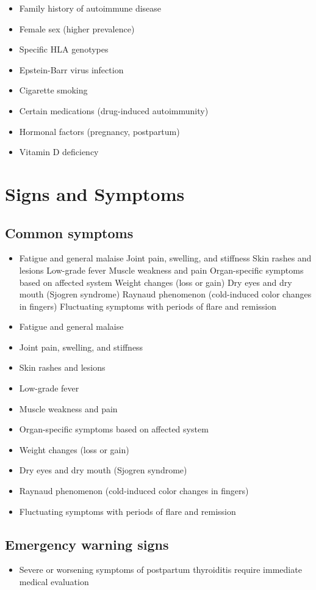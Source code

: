 \begin{itemize}[noitemsep]
  \item Family history of autoimmune disease
  \item Female sex (higher prevalence)
  \item Specific HLA genotypes
  \item Epstein-Barr virus infection
  \item Cigarette smoking
  \item Certain medications (drug-induced autoimmunity)
  \item Hormonal factors (pregnancy, postpartum)
  \item Vitamin D deficiency
\end{itemize}
\section{Signs and Symptoms}

\subsection{Common symptoms}
\begin{itemize}[noitemsep]
  \item Fatigue and general malaise Joint pain, swelling, and stiffness Skin rashes and lesions Low-grade fever Muscle weakness and pain Organ-specific symptoms based on affected system Weight changes (loss or gain) Dry eyes and dry mouth (Sjogren syndrome) Raynaud phenomenon (cold-induced color changes in fingers) Fluctuating symptoms with periods of flare and remission
  \item Fatigue and general malaise
  \item Joint pain, swelling, and stiffness
  \item Skin rashes and lesions
  \item Low-grade fever
  \item Muscle weakness and pain
  \item Organ-specific symptoms based on affected system
  \item Weight changes (loss or gain)
  \item Dry eyes and dry mouth (Sjogren syndrome)
  \item Raynaud phenomenon (cold-induced color changes in fingers)
  \item Fluctuating symptoms with periods of flare and remission
\end{itemize}

\subsection{Emergency warning signs}
\begin{itemize}[noitemsep]
  \item Severe or worsening symptoms of postpartum thyroiditis require immediate medical evaluation
\end{itemize}
